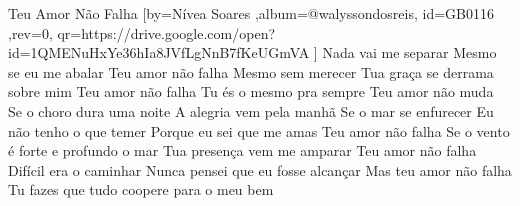 \beginsong
{Teu Amor Não Falha %
}[by={Nívea Soares %
},album={@walyssondosreis},
id={GB0116 %
},rev={0}, %
qr={https://drive.google.com/open?id=1QMENuHxYe36hIa8JVfLgNnB7fKeUGmVA %
}]
\beginverse*
Nada vai me separar
Mesmo se eu me abalar
Teu amor não falha
\endverse
\beginverse*
Mesmo sem merecer
Tua graça se derrama sobre mim
Teu amor não falha
\endverse
\beginchorus
Tu és o mesmo pra sempre
Teu amor não muda
Se o choro dura uma noite
A alegria vem pela manhã
Se o mar se enfurecer
Eu não tenho o que temer
Porque eu sei que me amas
Teu amor não falha
\endchorus
\beginverse*
Se o vento é forte e profundo o mar
Tua presença vem me amparar
Teu amor não falha
\endverse
\beginverse*
Difícil era o caminhar
Nunca pensei que eu fosse alcançar
Mas teu amor não falha
\endverse
\beginverse*
Tu fazes que tudo coopere para o meu bem
\endverse

